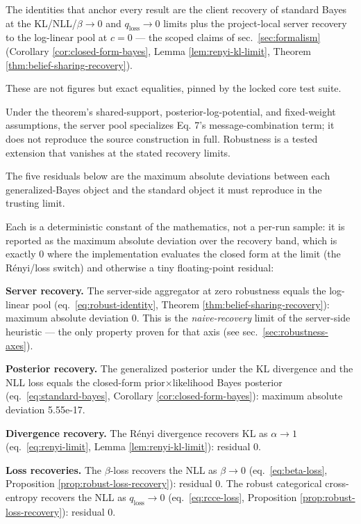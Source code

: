 \documentclass[
  english,
]{article}
\theoremstyle{plain}
\theoremstyle{definition}
\theoremstyle{remark}
\theoremstyle{definition}
\begin{document}
The identities that anchor every result are the client recovery of
standard Bayes at the KL/NLL/\(\beta\to0\) and \(q_{\text{loss}}\to0\)
limits plus the project-local server recovery to the log-linear pool at
\(c=0\) --- the scoped claims of sec.~\ref{sec:formalism} (Corollary
\ref{cor:closed-form-bayes}, Lemma \ref{lem:renyi-kl-limit}, Theorem
\ref{thm:belief-sharing-recovery}).

These are not figures but exact equalities, pinned by the locked core
test suite.

Under the theorem's shared-support, posterior-log-potential, and
fixed-weight assumptions, the server pool specializes Eq. 7's
message-combination term; it does not reproduce the source construction
in full. Robustness is a tested extension that vanishes at the stated
recovery limits.

The five residuals below are the maximum absolute deviations between
each generalized-Bayes object and the standard object it must reproduce
in the trusting limit.

Each is a deterministic constant of the mathematics, not a per-run
sample: it is reported as the maximum absolute deviation over the
recovery band, which is exactly \(0\) where the implementation evaluates
the closed form at the limit (the Rényi/loss switch) and otherwise a
tiny floating-point residual:

\textbf{Server recovery.} The server-side aggregator at zero robustness
equals the log-linear pool (eq.~\ref{eq:robust-identity}, Theorem
\ref{thm:belief-sharing-recovery}): maximum absolute deviation 0. This
is the \emph{naive-recovery} limit of the server-side heuristic --- the
only property proven for that axis (see sec.~\ref{sec:robustness-axes}).

\textbf{Posterior recovery.} The generalized posterior under the KL
divergence and the NLL loss equals the closed-form
prior\(\times\)likelihood Bayes posterior (eq.~\ref{eq:standard-bayes},
Corollary \ref{cor:closed-form-bayes}): maximum absolute deviation
5.55e-17.

\textbf{Divergence recovery.} The Rényi divergence recovers KL as
\(\alpha\to1\) (eq.~\ref{eq:renyi-limit}, Lemma
\ref{lem:renyi-kl-limit}): residual 0.

\textbf{Loss recoveries.} The \(\beta\)-loss recovers the NLL as
\(\beta\to 0\) (eq.~\ref{eq:beta-loss}, Proposition
\ref{prop:robust-loss-recovery}): residual 0. The robust categorical
cross-entropy recovers the NLL as \(q_{\text{loss}}\to 0\)
(eq.~\ref{eq:rcce-loss}, Proposition \ref{prop:robust-loss-recovery}):
residual 0.
\end{document}
